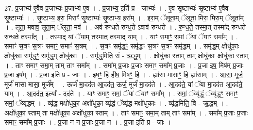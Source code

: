\documentclass[17pt]{extarticle}
\begin{document}
27. प्र॒जाभ्य॑ ए॒वैव प्र॒जाभ्यः॑ प्र॒जाभ्य॑ ए॒व । . प्र॒जाभ्य॒ इति॑ प्र - जाभ्यः॑ । . ए॒व सृ॒ष्टाभ्यः॑ सृ॒ष्टाभ्य॑ ए॒वैव सृ॒ष्टाभ्यः॑ । . सृ॒ष्टाभ्य॒ इरा॒ मिराꣳ॑ सृ॒ष्टाभ्यः॑ सृ॒ष्टाभ्य॒ इरा᳚म् । . इरा॒म् ॅलूता॒म् ॅलूता॒ मिरा॒ मिरा॒म् ॅलूता᳚म् । . लूता॒ मवाव॒ लूता॒म् ॅलूता॒ मव॑ । . अव॑ रुन्धते रुन्ध॒ते ऽवाव॑ रुन्धते । . रु॒न्ध॒ते॒ तस्मा॒त् तस्मा᳚द् रुन्धते रुन्धते॒ तस्मा᳚त् । . तस्मा॒द् यां ॅयाम् तस्मा॒त् तस्मा॒द् याम् । . याꣳ समाꣳ॒॒ समां॒ ॅयां ॅयाꣳ समा᳚म् । . समाꣳ॑ स॒त्रꣳ स॒त्रꣳ समाꣳ॒॒ समाꣳ॑ स॒त्रम् । . स॒त्रꣳ समृ॑द्धꣳ॒॒ समृ॑द्धꣳ स॒त्रꣳ स॒त्रꣳ समृ॑द्धम् । . समृ॑द्ध॒म् क्षोधु॑काः॒ क्षोधु॑काः॒ समृ॑द्धꣳ॒॒ समृ॑द्ध॒म् क्षोधु॑काः । . समृ॑द्ध॒मिति॒ सं - ऋ॒द्ध॒म् । . क्षोधु॑का॒ स्ताम् ताम् क्षोधु॑काः॒ क्षोधु॑का॒ स्ताम् । . ताꣳ समाꣳ॒॒ समा॒म् ताम् ताꣳ समा᳚म् । . समा᳚म् प्र॒जाः प्र॒जाः समाꣳ॒॒ समा᳚म् प्र॒जाः । . प्र॒जा इष॒ मिष॑म् प्र॒जाः प्र॒जा इष᳚म् । . प्र॒जा इति॑ प्र - जाः । . इषꣳ॒॒ हि हीष॒ मिषꣳ॒॒ हि । . ह्या॑सा मासाꣳ॒॒ हि ह्या॑साम् । . आ॒सा॒ मूर्ज॒ मूर्ज॑ मासा मासा॒ मूर्ज᳚म् । . ऊर्ज॑ मा॒दद॑त आ॒दद॑त॒ ऊर्ज॒ मूर्ज॑ मा॒दद॑ते । . आ॒दद॑ते॒ यां ॅया मा॒दद॑त आ॒दद॑ते॒ याम् । . आ॒दद॑त॒ इत्या᳚ - दद॑ते । . याꣳ समाꣳ॒॒ समां॒ ॅयां ॅयाꣳ समा᳚म् । . समां॒ ॅव्यृ॑द्धं॒ ॅव्यृ॑द्धꣳ॒॒ समाꣳ॒॒ समां॒ ॅव्यृ॑द्धम् । . व्यृ॑द्ध॒ मक्षो॑धुका॒ अक्षो॑धुका॒ व्यृ॑द्धं॒ ॅव्यृ॑द्ध॒ मक्षो॑धुकाः । . व्यृ॑द्ध॒मिति॒ वि - ऋ॒द्ध॒म् । . अक्षो॑धुका॒ स्ताम् ता मक्षो॑धुका॒ अक्षो॑धुका॒ स्ताम् । . ताꣳ समाꣳ॒॒ समा॒म् ताम् ताꣳ समा᳚म् । . समा᳚म् प्र॒जाः प्र॒जाः समाꣳ॒॒ समा᳚म् प्र॒जाः । . प्र॒जा न न प्र॒जाः प्र॒जा न । . प्र॒जा इति॑ प्र - जाः । \newline
\end{document}
